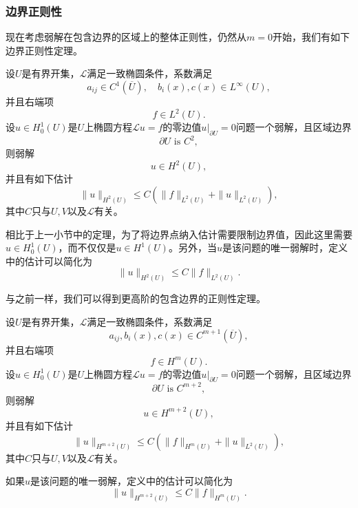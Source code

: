 \documentclass[a4paper,10pt]{ctexart}
\begin{document}
\subsubsection{边界正则性}
现在考虑弱解在包含边界的区域上的整体正则性，仍然从$ m=0 $开始，我们有如下边界正则性定理。
\begin{theorem}
    设$ U $是有界开集，$ \mathcal{L} $满足一致椭圆条件，系数满足
    \[
        a_{ij}\in C^1(\overline{U}),\quad b_i(x),c(x)\in L^\infty(U),
    \]
    并且右端项
    \[
        f\in L^2(U).
    \]
    设$ u\in H^1_0(U) $是$ U $上椭圆方程$ \mathcal{L}u = f $的零边值$ u|_{\partial U} = 0 $问题一个弱解，且区域边界
    \begin{equation}
        \partial U \text{ is } C^2,
    \end{equation}
    则弱解
    \begin{equation}
        u \in H^2(U),
    \end{equation}
    并且有如下估计
    \begin{equation}
        \| u \|_{H^2(U)} \leqslant C (\| f \|_{L^2(U)} + \| u \|_{L^2(U)}),
    \end{equation}
    其中$ C $只与$ U,V $以及$ \mathcal{L} $有关。
\end{theorem}
\noindent 相比于上一小节中的定理，为了将边界点纳入估计需要限制边界值，因此这里需要$ u\in H^1_0(U) $，而不仅仅是$ u\in H^1(U) $。另外，当$ u $是该问题的唯一弱解时，定义中的估计可以简化为
\begin{equation}
    \| u \|_{H^2(U)} \leqslant C \| f \|_{L^2(U)}.
\end{equation}

与之前一样，我们可以得到更高阶的包含边界的正则性定理。
\begin{theorem}
    设$ U $是有界开集，$ \mathcal{L} $满足一致椭圆条件，系数满足
    \[
        a_{ij},b_i(x),c(x)\in C^{m+1}(\overline{U}),
    \]
    并且右端项
    \[
        f\in H^m(U).
    \]
    设$ u\in H^1_0(U) $是$ U $上椭圆方程$ \mathcal{L}u = f $的零边值$ u|_{\partial U} = 0 $问题一个弱解，且区域边界
    \begin{equation}
        \partial U \text{ is } C^{m+2},
    \end{equation}
    则弱解
    \begin{equation}
        u \in H^{m+2}(U),
    \end{equation}
    并且有如下估计
    \begin{equation}
        \| u \|_{H^{m+2}(U)} \leqslant C (\| f \|_{H^m(U)} + \| u \|_{L^2(U)}),
    \end{equation}
    其中$ C $只与$ U,V $以及$ \mathcal{L} $有关。
\end{theorem}
\noindent 如果$ u $是该问题的唯一弱解，定义中的估计可以简化为
\begin{equation}
    \| u \|_{H^{m+2}(U)} \leqslant C \| f \|_{H^m(U)}.
\end{equation}
\end{document}
